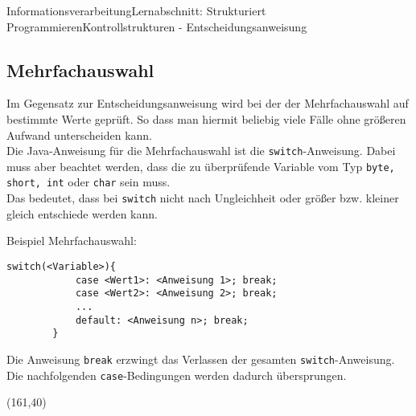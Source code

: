 \documentclass[11pt,oneside,openany,headings=optiontotoc,11pt,numbers=noenddot]{article}
\begin{document}
\begin{worksheet}{Informationsverarbeitung}{Lernabschnitt: Strukturiert Programmieren}{Kontrollstrukturen - Entscheidungsanweisung}
		\subsection{Mehrfachauswahl}
		Im Gegensatz zur Entscheidungsanweisung wird bei der der Mehrfachauswahl auf bestimmte Werte geprüft. So dass man hiermit beliebig viele Fälle ohne größeren Aufwand unterscheiden kann.\\
		Die Java-Anweisung für die Mehrfachauswahl ist die \lstinline[style=Python]|switch|-Anweisung. Dabei muss aber beachtet werden, dass die zu überprüfende Variable vom Typ \lstinline[style=Python]|byte, short, int| oder \lstinline[style=Python]|char| sein muss.\\
		Das bedeutet, dass bei \lstinline[style=Python]|switch| nicht nach Ungleichheit oder größer bzw. kleiner gleich entschiede werden kann.
		\par\noindent
		Beispiel Mehrfachauswahl:
		\begin{lstlisting}[style=Python,frame=single]
		switch(<Variable>){
			case <Wert1>: <Anweisung 1>; break;
			case <Wert2>: <Anweisung 2>; break;
			...
			default: <Anweisung n>; break;
		}
		\end{lstlisting}
		Die Anweisung \lstinline[style=Python]|break| erzwingt das Verlassen der gesamten \lstinline[style=Python]|switch|-Anweisung. Die nachfolgenden \lstinline[style=Python]|case|-Bedingungen werden dadurch übersprungen.\\
		\begin{struktogramm}(161,40)
			\caseend
		\end{struktogramm}
	\end{worksheet}
\end{document}
